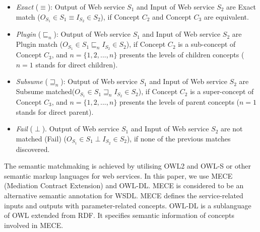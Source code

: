 \documentclass{llncs}
\begin{document}
\begin{itemize}
\item \textit{Exact} ($\equiv$): Output of Web service $S_{1}$ and Input of Web service $S_{2}$ are Exact match ($ O_{S_1} \in S_{1} \equiv I_{S_2} \in S_{2}$), if  Concept $C_{2}$ and Concept $C_{3}$ are equivalent.
\item \textit{Plugin} ($\sqsubseteq_{n}$): Output of Web service $S_{1}$ and Input of Web service $S_{2}$ are Plugin match ($O_{S_1} \in S_{1} \sqsubseteq_{n} I_{S_2} \in S_{2}$), if  Concept $C_{2}$ is a sub-concept of Concept $C_{3}$, and $n = \{1,2,...,n \}$ presents the levels of children concepts ($n=1$ stands for direct children).
\item \textit{Subsume} ($\sqsupseteq_{n}$): Output of Web service $S_{1}$ and Input of Web service $S_{2}$ are Subsume matched($O_{S_1} \in S_{1} \sqsupseteq_{n} I_{S_2} \in S_{2}$), if  Concept $C_{2}$ is a super-concept of  Concept $C_{3}$, and $n = \{1,2,...,n \}$ presents the levels of parent concepts ($n=1$ stands for direct parent).
\item \textit{Fail} ($\perp$). Output of Web service $S_{1}$ and Input of Web service $S_{2}$ are not matched (Fail) ($O_{S_1} \in S_{1} \perp I_{S_2} \in S_{2}$), if none of the previous matches discovered.
\end{itemize}

The semantic matchmaking is achieved by utilising OWL2 and OWL-S or other semantic markup languages for web services. In this paper, we use MECE (Mediation Contract Extension) \cite{bleul2008self} and OWL-DL. MECE is considered to be an alternative semantic annotation for WSDL. MECE defines the service-related inputs and outputs with parameter-related concepts. OWL-DL is a sublanguage of OWL extended from RDF. It specifies semantic information of concepts involved in MECE.
\end{document}
